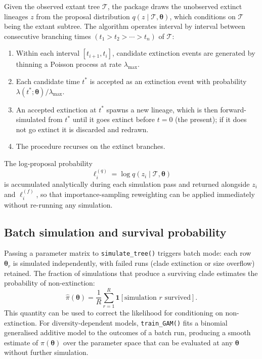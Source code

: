 \documentclass[12pt,a4paper]{article}
\newcommand{\obs}{\mathcal{T}}
\newcommand{\pars}{\bm{\theta}}
\newcommand{\logf}{\ell^{(f)}}
\newcommand{\logq}{\ell^{(q)}}
\begin{document}
Given the observed extant tree $\obs$, the package draws the unobserved
extinct lineages $z$ from the proposal distribution $q(z \mid \obs, \pars)$,
which conditions on $\obs$ being the extant subtree. The algorithm operates
interval by interval between consecutive branching times
$(t_1 > t_2 > \cdots > t_n)$ of $\obs$:
\begin{enumerate}
  \item Within each interval $[t_{i+1}, t_i]$, candidate extinction events
    are generated by thinning a Poisson process at rate $\lambda_{\max}$.
  \item Each candidate time $t^*$ is accepted as an extinction event with
    probability $\lambda(t^*;\pars) / \lambda_{\max}$.
  \item An accepted extinction at $t^*$ spawns a new lineage, which is
    then forward-simulated from $t^*$ until it goes extinct before $t = 0$
    (the present); if it does not go extinct it is discarded and redrawn.
  \item The procedure recurses on the extinct branches.
\end{enumerate}
The log-proposal probability
\begin{equation}\label{eq:logq}
  \logq_i = \log q(z_i \mid \obs, \pars)
\end{equation}
is accumulated analytically during each simulation pass and returned
alongside $z_i$ and $\logf_i$, so that importance-sampling reweighting
can be applied immediately without re-running any simulation.

\subsection{Batch simulation and survival probability}

Passing a parameter matrix to \texttt{simulate\_tree()} triggers batch mode:
each row $\pars_r$ is simulated independently, with failed runs
(clade extinction or size overflow) retained. The fraction of simulations
that produce a surviving clade estimates the probability of non-extinction:
\begin{equation}
  \hat{\pi}(\pars) = \frac{1}{R}\sum_{r=1}^R
  \mathbf{1}[\text{simulation }r\text{ survived}].
\end{equation}
This quantity can be used to correct the likelihood for conditioning on
non-extinction. For diversity-dependent models, \texttt{train\_GAM()} fits a
binomial generalised additive model to the outcomes of a batch run, producing
a smooth estimate of $\pi(\pars)$ over the parameter space that can be
evaluated at any $\pars$ without further simulation.
\end{document}
